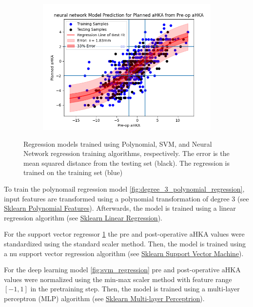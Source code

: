 \documentclass{article}
\begin{document}
\begin{figure}[ht]
\begin{subfigure}{.32\textwidth}
		\includegraphics[width=\textwidth]{neural_network_regression.png}
		\caption{}
		\label{fig:neural_network_regression}
	\end{subfigure}
	\caption*{
		\footnotesize
		Regression models trained using Polynomial, SVM, and Neural Network regression training algorithms, respectively.
		The error is the mean squared distance from the testing set (black).
		The regression is trained on the training set (blue)
	}
	\label{fig:regression_models}
\end{figure}

To train the polynomail regression model \ref{fig:degree_3_polynomial_regression}, input features are transformed using a polynomial transformation of degree 3 
(see \href{https://scikit-learn.org/stable/modules/generated/sklearn.linear_model.LinearRegression.html}{\underline{Sklearn Polynomial Features}}).
Afterwards, the model is trained using a linear regression algorithm 
(see \href{https://scikit-learn.org/stable/modules/generated/sklearn.linear_model.LinearRegression.html}{\underline{Sklearn Linear Regression}}).

For the support vector regressor \ref{fig:neural_network_regression} the pre and post-operative aHKA values were standardized using the standard scaler method.
Then, the model is trained using a nu support vector regression algorithm
(see \href{https://scikit-learn.org/stable/modules/generated/sklearn.svm.NuSVR.html#sklearn.svm.NuSVR}{\underline{Sklearn Support Vector Machine}}).

For the deep learning model \ref{fig:svm_regression} pre and post-operative aHKA values were normalized using the min-max scaler method with feature range $[-1, 1]$ in the pretraining step.
Then, the model is trained using a multi-layer perceptron (MLP) algorithm 
(see \href{https://scikit-learn.org/stable/modules/generated/sklearn.neural_network.MLPRegressor.html}{\underline{Sklearn Multi-layer Perceptrion}}).

\medskip

\printbibliography
\end{document}
